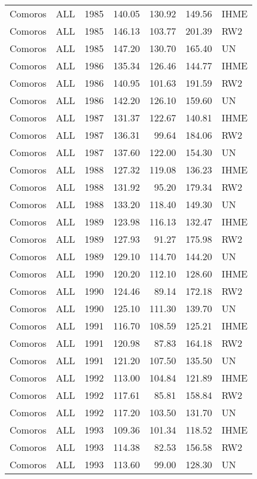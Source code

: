 \begin{longtable}{lllrrrl}
  Comoros & ALL & 1985 & 140.05 & 130.92 & 149.56 & IHME \\ 
  Comoros & ALL & 1985 & 146.13 & 103.77 & 201.39 & RW2 \\ 
  Comoros & ALL & 1985 & 147.20 & 130.70 & 165.40 & UN \\ 
  Comoros & ALL & 1986 & 135.34 & 126.46 & 144.77 & IHME \\ 
  Comoros & ALL & 1986 & 140.95 & 101.63 & 191.59 & RW2 \\ 
  Comoros & ALL & 1986 & 142.20 & 126.10 & 159.60 & UN \\ 
  Comoros & ALL & 1987 & 131.37 & 122.67 & 140.81 & IHME \\ 
  Comoros & ALL & 1987 & 136.31 & 99.64 & 184.06 & RW2 \\ 
  Comoros & ALL & 1987 & 137.60 & 122.00 & 154.30 & UN \\ 
  Comoros & ALL & 1988 & 127.32 & 119.08 & 136.23 & IHME \\ 
  Comoros & ALL & 1988 & 131.92 & 95.20 & 179.34 & RW2 \\ 
  Comoros & ALL & 1988 & 133.20 & 118.40 & 149.30 & UN \\ 
  Comoros & ALL & 1989 & 123.98 & 116.13 & 132.47 & IHME \\ 
  Comoros & ALL & 1989 & 127.93 & 91.27 & 175.98 & RW2 \\ 
  Comoros & ALL & 1989 & 129.10 & 114.70 & 144.20 & UN \\ 
  Comoros & ALL & 1990 & 120.20 & 112.10 & 128.60 & IHME \\ 
  Comoros & ALL & 1990 & 124.46 & 89.14 & 172.18 & RW2 \\ 
  Comoros & ALL & 1990 & 125.10 & 111.30 & 139.70 & UN \\ 
  Comoros & ALL & 1991 & 116.70 & 108.59 & 125.21 & IHME \\ 
  Comoros & ALL & 1991 & 120.98 & 87.83 & 164.18 & RW2 \\ 
  Comoros & ALL & 1991 & 121.20 & 107.50 & 135.50 & UN \\ 
  Comoros & ALL & 1992 & 113.00 & 104.84 & 121.89 & IHME \\ 
  Comoros & ALL & 1992 & 117.61 & 85.81 & 158.84 & RW2 \\ 
  Comoros & ALL & 1992 & 117.20 & 103.50 & 131.70 & UN \\ 
  Comoros & ALL & 1993 & 109.36 & 101.34 & 118.52 & IHME \\ 
  Comoros & ALL & 1993 & 114.38 & 82.53 & 156.58 & RW2 \\ 
  Comoros & ALL & 1993 & 113.60 & 99.00 & 128.30 & UN \\ 

\end{longtable}
